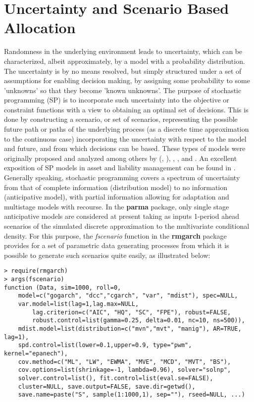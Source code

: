 \section{Uncertainty and Scenario Based Allocation}\label{sec:1}
Randomness in the underlying environment leads to uncertainty, which can be
characterized, albeit approximately, by a model with a probability
distribution. The uncertainty is by no means resolved, but simply structured
under a set of assumptions for enabling decision making, by assigning some
probability to some 'unknowns' so that they become 'known unknowns'. The
purpose of stochastic programming (SP) is to incorporate such uncertainty
into the objective or constraint functions with a view to obtaining an
optimal set of decisions. This is done by constructing a scenario, or set of
scenarios, representing the possible future path or paths of the underlying
process (as a discrete time approximation to the continuous case)
incorporating the uncertainty with respect to the model and future, and from
which decisions can be based. These types of models were originally proposed
and analyzed among others by  (\citeyear*{Dantzig1956},
\citeyear*{Dantzig1992}), , ,
 and . An excellent
exposition of SP models in asset and liability management can be found in
. Generally speaking, stochastic programming
covers a spectrum of uncertainty from that of complete information
(distribution model) to no information (anticipative model), with partial
information allowing for adaptation and multistage models with recourse. In
the \textbf{parma} package, only single stage anticipative models are
considered at present taking as inputs 1-period ahead scenarios of the
simulated discrete approximation to the multivariate conditional density.
For this purpose, the \emph{fscenario} function in the \textbf{rmgarch}
package provides for a set of parametric data generating processes from which
it is possible to generate such scenarios quite easily, as illustrated below:\\
\newline
\begin{lstlisting}
> require(rmgarch)
> args(fscenario)
function (Data, sim=1000, roll=0,
    model=c("gogarch", "dcc","cgarch", "var", "mdist"), spec=NULL,
    var.model=list(lag=1,lag.max=NULL,
        lag.criterion=c("AIC", "HQ", "SC", "FPE"), robust=FALSE,
        robust.control=list(gamma=0.25, delta=0.01, nc=10, ns=500)),
    mdist.model=list(distribution=c("mvn","mvt", "manig"), AR=TRUE, lag=1),
    spd.control=list(lower=0.1,upper=0.9, type="pwm", kernel="epanech"),
    cov.method=c("ML", "LW", "EWMA", "MVE", "MCD", "MVT", "BS"),
    cov.options=list(shrinkage=-1, lambda=0.96), solver="solnp",
    solver.control=list(), fit.control=list(eval.se=FALSE),
    cluster=NULL, save.output=FALSE, save.dir=getwd(),
    save.name=paste("S", sample(1:1000,1), sep=""), rseed=NULL, ...)
\end{lstlisting}
